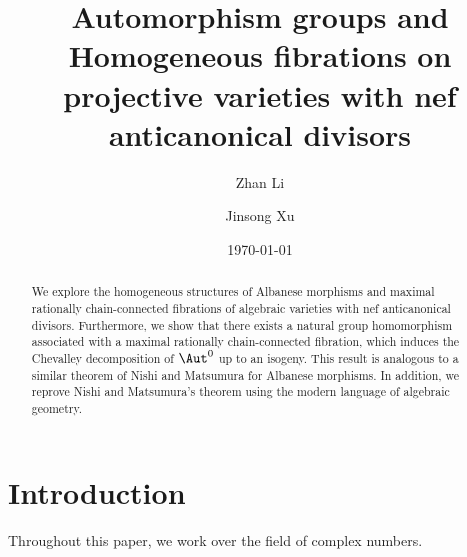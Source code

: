 \documentclass[11pt]{amsart}
\begin{document}
\title[Automorphism groups and Homogeneous fibrations]{Automorphism groups and Homogeneous fibrations on projective  varieties with nef anticanonical divisors}


\date{\today}

\begin{abstract}
We explore the homogeneous structures of Albanese morphisms and maximal rationally chain-connected fibrations of algebraic varieties with nef anticanonical divisors. Furthermore, we show that there exists a natural group homomorphism associated with a maximal rationally chain-connected fibration, which induces the Chevalley decomposition of $\Aut^0$ up to an isogeny. This result is analogous to a similar theorem of Nishi and Matsumura for Albanese morphisms. In addition, we reprove Nishi and Matsumura's theorem using the modern language of algebraic geometry.
\end{abstract}

\author{Zhan Li}
\address[Zhan Li]{Department of Mathematics, Southern University of Science and Technology, 1088 Xueyuan Rd, Shenzhen 518055, China} 

\author{Jinsong Xu}
\address[Jinsong Xu]{Department of Mathematical Sciences, Xi’an Jiaotong-Liverpool University, No.111 Renai Rd, Industrial Park, Suzhou 215000, China} 


\maketitle

\tableofcontents

\section{Introduction}\label{sec: intro}

Throughout this paper, we work over the field of complex numbers. 
\end{document}

